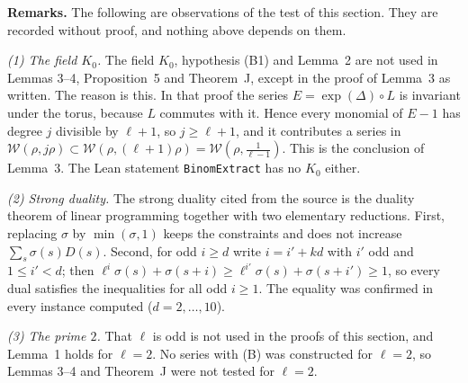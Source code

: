 \documentclass[11pt,letterpaper]{article}
\begin{document}
\textbf{Remarks.} The following are observations of the test of this section. They are recorded
without proof, and nothing above depends on them.

\emph{(1) The field $K_0$.} The field $K_0$, hypothesis (B1) and Lemma~2 are not used in Lemmas 3--4,
Proposition~5 and Theorem~J, except in the proof of Lemma~3 as written. The reason is this. In that proof
the series $E=\exp(\Delta)\circ L$ is invariant under the torus, because $L$ commutes with it. Hence every
monomial of $E-1$ has degree $j$ divisible by $\ell+1$, so $j\ge\ell+1$, and it contributes a series in
$\mathcal W(\rho,j\rho)\subset\mathcal W(\rho,(\ell+1)\rho)=\mathcal W(\rho,\frac1{\ell-1})$. This is the
conclusion of Lemma~3. The Lean statement \texttt{BinomExtract} has no $K_0$ either.

\emph{(2) Strong duality.} The strong duality cited from the source is the duality theorem of linear
programming together with two elementary reductions. First, replacing $\sigma$ by $\min(\sigma,1)$ keeps the
constraints and does not increase $\sum_s\sigma(s)D(s)$. Second, for odd $i\ge d$ write $i=i'+kd$ with $i'$
odd and $1\le i'<d$; then $\ell^i\sigma(s)+\sigma(s+i)\ge\ell^{i'}\sigma(s)+\sigma(s+i')\ge1$, so every dual
satisfies the inequalities for all odd $i\ge1$. The equality was confirmed in every instance computed
($d=2,\ldots,10$).

\emph{(3) The prime $2$.} That $\ell$ is odd is not used in the proofs of this section, and Lemma~1 holds
for $\ell=2$. No series with (B) was constructed for $\ell=2$, so Lemmas 3--4 and Theorem~J were not tested
for $\ell=2$.
\end{document}
